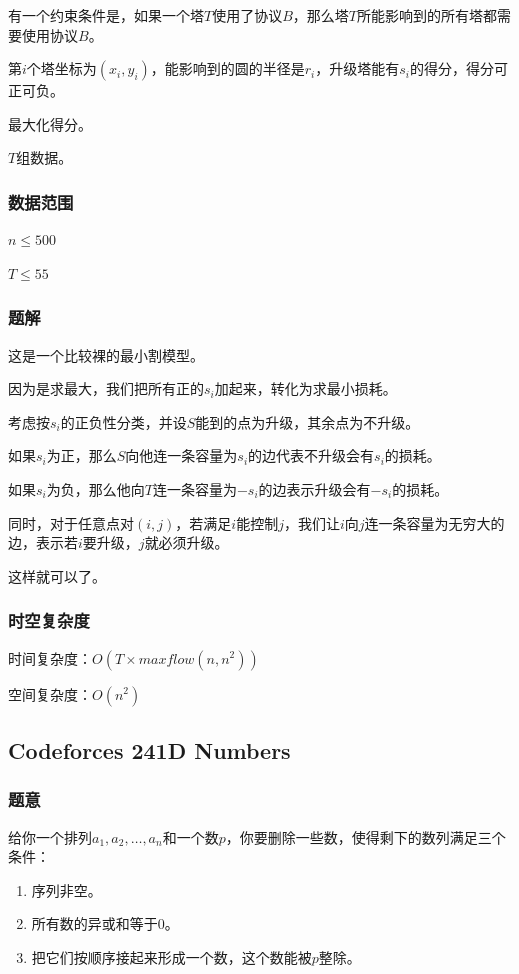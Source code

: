 \documentclass{ctexart}
\begin{document}
有一个约束条件是，如果一个塔$T$使用了协议$B$，那么塔$T$所能影响到的所有塔都需要使用协议$B$。

第$i$个塔坐标为$(x_i,y_i)$，能影响到的圆的半径是$r_i$，升级塔能有$s_i$的得分，得分可正可负。

最大化得分。

$T$组数据。
\subsubsection{数据范围}
$n \le 500$

$T \le 55$
\subsubsection{题解}
这是一个比较裸的最小割模型。

因为是求最大，我们把所有正的$s_i$加起来，转化为求最小损耗。

考虑按$s_i$的正负性分类，并设$S$能到的点为升级，其余点为不升级。

如果$s_i$为正，那么$S$向他连一条容量为$s_i$的边代表不升级会有$s_i$的损耗。

如果$s_i$为负，那么他向$T$连一条容量为$-s_i$的边表示升级会有$-s_i$的损耗。

同时，对于任意点对$(i,j)$，若满足$i$能控制$j$，我们让$i$向$j$连一条容量为无穷大的边，表示若$i$要升级，$j$就必须升级。

这样就可以了。
\subsubsection{时空复杂度}
时间复杂度：$O(T \times maxflow(n,n^2))$

空间复杂度：$O(n^2)$
\subsection{Codeforces 241D Numbers}
\subsubsection{题意}
给你一个排列$a_1,a_2,\ldots,a_n$和一个数$p$，你要删除一些数，使得剩下的数列满足三个条件：

\begin{enumerate}
\item 序列非空。
\item 所有数的异或和等于$0$。
\item 把它们按顺序接起来形成一个数，这个数能被$p$整除。
\end{enumerate}
\end{document}
